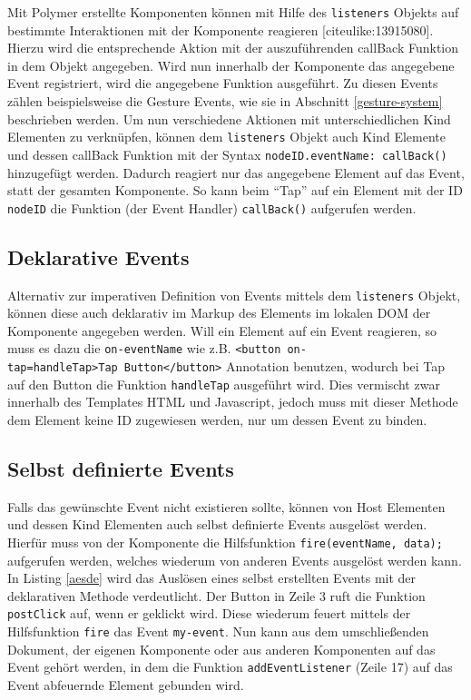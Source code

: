 Mit Polymer erstellte Komponenten können mit Hilfe des \texttt{listeners} Objekts auf bestimmte Interaktionen mit der Komponente reagieren {[}citeulike:13915080{]}. Hierzu wird die entsprechende Aktion mit der auszuführenden callBack Funktion in dem Objekt angegeben. Wird nun innerhalb der Komponente das angegebene Event registriert, wird die angegebene Funktion ausgeführt. Zu diesen Events zählen beispielsweise die Gesture Events, wie sie in Abschnitt \ref{gesture-system} beschrieben werden. Um nun verschiedene Aktionen mit unterschiedlichen Kind Elementen zu verknüpfen, können dem \texttt{listeners} Objekt auch Kind Elemente und dessen callBack Funktion mit der Syntax \texttt{nodeID.eventName:\ callBack()} hinzugefügt werden. Dadurch reagiert nur das angegebene Element auf das Event, statt der gesamten Komponente. So kann beim ``Tap'' auf ein Element mit der ID \texttt{nodeID} die Funktion (der Event Handler) \texttt{callBack()} aufgerufen werden.


\subsection{Deklarative Events}\label{deklarative-events}

Alternativ zur imperativen Definition von Events mittels dem \texttt{listeners} Objekt, können diese auch deklarativ im Markup des Elements im lokalen \ac{DOM} der Komponente angegeben werden. Will ein Element auf ein Event reagieren, so muss es dazu die \texttt{on-eventName} wie z.B. \texttt{\textless{}button\ on-tap=\dq handleTap\dq\textgreater{}Tap\ Button\textless{}/button\textgreater{}} Annotation benutzen, wodurch bei Tap auf den Button die Funktion \texttt{handleTap} ausgeführt wird. Dies vermischt zwar innerhalb des Templates \ac{HTML} und Javascript, jedoch muss mit dieser Methode dem Element keine ID zugewiesen werden, nur um dessen Event zu binden.


\subsection{Selbst definierte Events}\label{selbst-definierte-events}

Falls das gewünschte Event nicht existieren sollte, können von Host Elementen und dessen Kind Elementen auch selbst definierte Events ausgelöst werden. Hierfür muss von der Komponente die Hilfsfunktion \texttt{fire(eventName,\ data);} aufgerufen werden, welches wiederum von anderen Events ausgelöst werden kann. In Listing \ref{aesde} wird das Auslösen eines selbst erstellten Events mit der deklarativen Methode verdeutlicht. Der Button in Zeile 3 ruft die Funktion \texttt{postClick} auf, wenn er geklickt wird. Diese wiederum feuert mittels der Hilfsfunktion \texttt{fire} das Event \texttt{my-event}. Nun kann aus dem umschließenden Dokument, der eigenen Komponente oder aus anderen Komponenten auf das Event gehört werden, in dem die Funktion \texttt{addEventListener} (Zeile 17) auf das Event abfeuernde Element gebunden wird.


